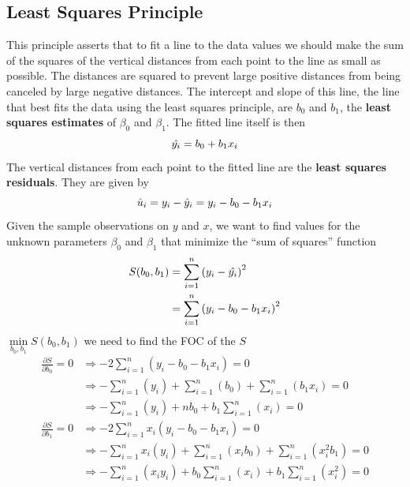 \documentclass[a4paper, 10pt]{article}
\theoremstyle{definition}	%
\begin{document}
\subsection{Least Squares Principle}
This principle asserts that to fit a line to the data values we should make the sum of the squares of the vertical distances from each point to the line as small as possible. The distances are squared to prevent large positive distances from being canceled by large negative distances. The intercept and slope of this line, the line that best fits the data using the least squares principle, are \(b_0\) and \(b_1\), the \textbf{least squares estimates} of 
\(\beta_0\) and \(\beta_1\). The fitted line itself is then
\begin{equation}
    \Hat{y_i} = b_0 + b_1 x_i
\end{equation}
The vertical distances from each point to the fitted line are the \textbf{least squares residuals}. They are given by
\begin{equation}
    \Hat{u}_i = y_i - \Hat{y}_i = y_i - b_0 - b_1 x_i
\end{equation}
Given the sample observations on \(y\) and \(x\), we want to find values for the unknown parameters \(\beta_0\) and \(\beta_1\) that minimize the “sum of squares” function 
\begin{align*}
    S(b_0, b_1) &= \sum_{i=1}^{n} \left( y_i - \Hat{y_i} \right)^2 \\
                &= \sum_{i=1}^{n} \left( y_i - b_0 - b_1 x_i\right)^2
\end{align*}
\(\min \limits_{b_0, b_1} S(b_0, b_1)\) we need to find the FOC of the \(S\)
\begin{align*}
    \frac{\partial S}{\partial b_0} = 0 
    &\Rightarrow -2\sum_{i=1}^{n} \left( y_i - b_0 - b_1 x_i\right) = 0\\
    & \Rightarrow -\sum_{i=1}^{n} \left(y_i\right)+\sum_{i=1}^{n} \left(b_0\right)+\sum_{i=1}^{n} \left(b_1 x_i\right) = 0\\
    & \Rightarrow -\sum_{i=1}^{n} \left(y_i\right) + nb_0+b_1\sum_{i=1}^{n} \left(x_i\right)=0 \\
    \frac{\partial S}{\partial b_1} = 0 
    &\Rightarrow -2\sum_{i=1}^{n} x_i \left( y_i - b_0 - b_1 x_i\right) = 0\\
    &\Rightarrow -\sum_{i=1}^{n} x_i \left(y_i\right) + \sum_{i=1}^{n} \left(x_i b_0\right) + 
    \sum_{i=1}^{n} \left(x_i^2 b_1\right) = 0\\
    &\Rightarrow -\sum_{i=1}^{n} \left(x_i y_i\right) + b_0\sum_{i=1}^{n} \left(x_i\right) + 
    b_1\sum_{i=1}^{n} \left(x_i^2\right) = 0
\end{align*}
\end{document}
